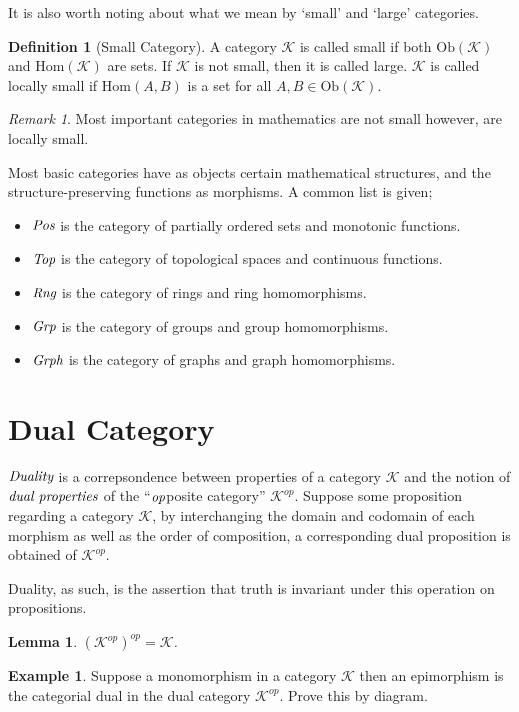 \documentclass[10pt, oneside, reqno]{amsart}
\theoremstyle{plain}%
\newtheorem{lem}[thm]{Lemma}
\theoremstyle{definition}
\newtheorem{defn}[thm]{Definition}
\newtheorem{exmp}[thm]{Example}
\theoremstyle{remark}
\newtheorem*{rem}{Remark}
\newcommand{\Cat}{\mathcal{K}}
\begin{document}
It is also worth noting about what we mean by `small' and `large' categories.

\begin{defn}[Small Category]
	A category $\Cat$ is called small if both $\text{Ob}(\Cat)$ and $\text{Hom}(\Cat)$ are sets.
	If $\Cat$ is not small, then it is called large.
	$\Cat$ is called locally small if $\text{Hom}(A,B)$ is a set for all $A, B \in \text{Ob}(\Cat)$.
\end{defn}

\begin{rem}
	Most important categories in mathematics are not small however, are locally small.
\end{rem}

Most basic categories have as objects certain mathematical structures, and the structure-preserving
functions as morphisms. A common list is given;
\begin{itemize}
\item $\emph{Pos}$ is the category of partially ordered sets and monotonic functions.
\item $\emph{Top}$ is the category of topological spaces and continuous functions.
\item $\emph{Rng}$ is the category of rings and ring homomorphisms.
\item $\emph{Grp}$ is the category of groups and group homomorphisms.
\item $\emph{Grph}$ is the category of graphs and graph homomorphisms.
\end{itemize}

\section{Dual Category} %
\label{sec:dualcategory}
$\emph{Duality}$ is a correpsondence between properties of a category $\mathcal{K}$ and the notion
of $\emph{dual properties}$ of the ``$\emph{op}$posite category'' $\mathcal{K}^{op}$. Suppose some proposition
regarding a category $\mathcal{K}$, by interchanging the domain and codomain of each morphism as well as
the order of composition, a corresponding dual proposition is obtained of $\mathcal{K}^{op}$.

Duality, as such, is the assertion that truth is invariant under this operation on propositions.
\begin{lem}
 $(\mathcal{K}^{op})^{op} = \mathcal{K}$.
\end{lem}

\begin{exmp}
 Suppose a monomorphism in a category $\mathcal{K}$ then an epimorphism is the categorial dual
 in the dual category $\mathcal{K}^{op}$. Prove this by diagram.
\end{exmp}
\end{document}
